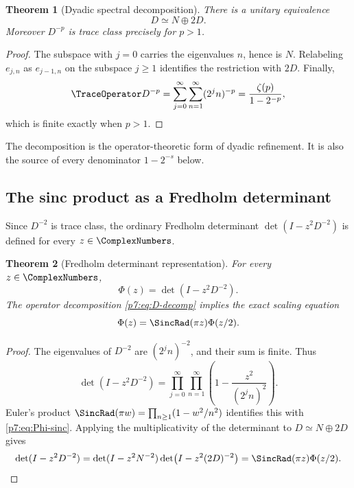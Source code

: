 \documentclass[11pt]{article}
\numberwithin{equation}{section}
\newtheorem{theorem}{Theorem}[section]
\theoremstyle{definition}
\theoremstyle{remark}
\begin{document}
\begin{theorem}[Dyadic spectral decomposition]\label{p7:thm:D-decomp}
There is a unitary equivalence
\begin{equation}\label{p7:eq:D-decomp}
 D\simeq N\oplus2D.
\end{equation}
Moreover $D^{-p}$ is trace class precisely for $p>1$.
\end{theorem}

\begin{proof}
The subspace with $j=0$ carries the eigenvalues $n$, hence is $N$.  Relabeling $e_{j,n}$ as $e_{j-1,n}$ on the subspace $j\ge1$ identifies the restriction with $2D$.  Finally,
\[
 \TraceOperator D^{-p}
 =\sum_{j=0}^{\infty}\sum_{n=1}^{\infty}(2^jn)^{-p}
 =\frac{\zeta(p)}{1-2^{-p}},
\]
which is finite exactly when $p>1$.
\end{proof}

The decomposition is the operator-theoretic form of dyadic refinement.  It is also the source of every denominator $1-2^{-s}$ below.

\subsection{The sinc product as a Fredholm determinant}

Since $D^{-2}$ is trace class, the ordinary Fredholm determinant $\det(I-z^2D^{-2})$ is defined for every $z\in\ComplexNumbers$.

\begin{theorem}[Fredholm determinant representation]\label{p7:thm:fredholm}
For every $z\in\ComplexNumbers$,
\begin{equation}\label{p7:eq:fredholm}
 \boxed{\ \Phi(z)=\det(I-z^2D^{-2}).\ }
\end{equation}
The operator decomposition \cref{p7:eq:D-decomp} implies the exact scaling equation
\begin{equation}\label{p7:eq:scaling-spectral}
 \Phi(z)=\SincRad(\pi z)\Phi(z/2).
\end{equation}
\end{theorem}

\begin{proof}
The eigenvalues of $D^{-2}$ are $(2^jn)^{-2}$, and their sum is finite.  Thus
\[
 \det(I-z^2D^{-2})
 =\prod_{j=0}^{\infty}\prod_{n=1}^{\infty}
 \left(1-\frac{z^2}{(2^jn)^2}\right).
\]
Euler's product $\SincRad(\pi w)=\prod_{n\ge1}(1-w^2/n^2)$ identifies this with \cref{p7:eq:Phi-sinc}.  Applying the multiplicativity of the determinant to $D\simeq N\oplus2D$ gives
\[
 \det(I-z^2D^{-2})
 =\det(I-z^2N^{-2})
  \det\!\left(I-z^2(2D)^{-2}\right)
 =\SincRad(\pi z)\Phi(z/2).
\]
\end{proof}
\end{document}

